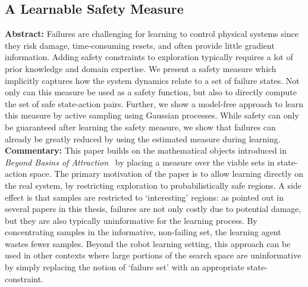 \subsection{A Learnable Safety Measure}
\textbf{Abstract: }
Failures are challenging for learning to control physical systems since they risk damage, time-consuming resets, and often provide little gradient information. Adding safety constraints to exploration typically requires a lot of prior knowledge and domain expertise. We present a safety measure which implicitly captures how the system dynamics relate to a set of failure states. Not only can this measure be used as a safety function, but also to directly compute the set of safe state-action pairs. Further, we show a model-free approach to learn this measure by active sampling using Gaussian processes. While safety can only be guaranteed after learning the safety measure, we show that failures can already be greatly reduced by using the estimated measure during learning. \\
\textbf{Commentary: }
This paper builds on the mathematical objects introduced in \emph{Beyond Basins of Attraction}~\cite{heim2019beyond} by placing a measure over the viable sets in state-action space. The primary motivation of the paper is to allow learning directly on the real system, by restricting exploration to probabilistically safe regions. A side effect is that samples are restricted to `interesting' regions: as pointed out in several papers in this thesis, failures are not only costly due to potential damage, but they are also typically uninformative for the learning process. By concentrating samples in the informative, non-failing set, the learning agent wastes fewer samples. Beyond the robot learning setting, this approach can be used in other contexts where large portions of the search space are uninformative by simply replacing the notion of `failure set' with an appropriate state-constraint. \\
